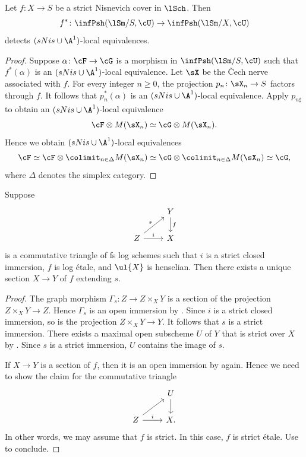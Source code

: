\documentclass[10pt]{amsart}
\begin{document}
\begin{lem}
\label{loc.3}
Let $f\colon X\to S$ be a strict Nisnevich cover in $\lSch$.
Then
\[
f^*\colon \infPsh(\lSm/S,\cU)
\to
\infPsh(\lSm/X,\cU)
\]
detects $(sNis\cup \A^1)$-local equivalences.
\end{lem}
\begin{proof}
Suppose $\alpha\colon \cF\to \cG$ is a morphism in $\infPsh(\lSm/S,\cU)$ such that $f^*(\alpha)$ is an $(sNis\cup \A^1)$-local equivalence.
Let $\sX$ be the \v{C}ech nerve associated with $f$.
For every integer $n\geq 0$, the projection $p_n\colon \sX_n\to S$ factors through $f$.
It follows that $p_n^*(\alpha)$ is an $(sNis\cup \A^1)$-local equivalence.
Apply $p_{n\sharp}$ to obtain an $(sNis\cup \A^1)$-local equivalence
\[
\cF\otimes M(\sX_n)
\simeq
\cG\otimes M(\sX_n).
\]
Hence we obtain $(sNis\cup \A^1)$-local equivalences
\[
\cF
\simeq
\cF\otimes \colimit_{n\in \Delta}M(\sX_n)
\simeq
\cG\otimes \colimit_{n\in \Delta}M(\sX_n)
\simeq
\cG,
\]
where $\Delta$ denotes the simplex category.
\end{proof}

\begin{lem}
\label{loc.12}
Suppose
\[
\begin{tikzcd}
&Y\ar[d,"f"]
\\
Z\ar[ru,"s"]\ar[r,"i"]&
X
\end{tikzcd}
\]
is a commutative triangle of fs log schemes such that $i$ is a strict closed immersion, $f$ is log \'etale, and $\ul{X}$ is henselian.
Then there exists a unique section $X\to Y$ of $f$ extending $s$.
\end{lem}
\begin{proof}
The graph morphism $\Gamma_s\colon Z\to Z\times_X Y$ is a section of the projection $Z\times_X Y\to Z$.
Hence $\Gamma_s$ is an open immersion by \cite[Lemma A.11.2]{logDM}.
Since $i$ is a strict closed immersion, so is the projection $Z\times_X Y\to Y$.
It follows that $s$ is a strict immersion.
There exists a maximal open subscheme $U$ of $Y$ that is strict over $X$ by \cite[Lemma A.4.4]{logDM}.
Since $s$ is a strict immersion, $U$ contains the image of $s$.

If $X\to Y$ is a section of $f$, then it is an open immersion by \cite[Lemma A.11.2]{logDM} again.
Hence we need to show the claim for the commutative triangle
\[
\begin{tikzcd}
&U\ar[d]
\\
Z\ar[ru]\ar[r,"i"]&
X.
\end{tikzcd}
\]
In other words, we may assume that $f$ is strict.
In this case, $f$ is strict \'etale.
Use \cite[Th\'eor\`eme IV.18.5.11(b)]{EGA} to conclude.
\end{proof}
\end{document}
